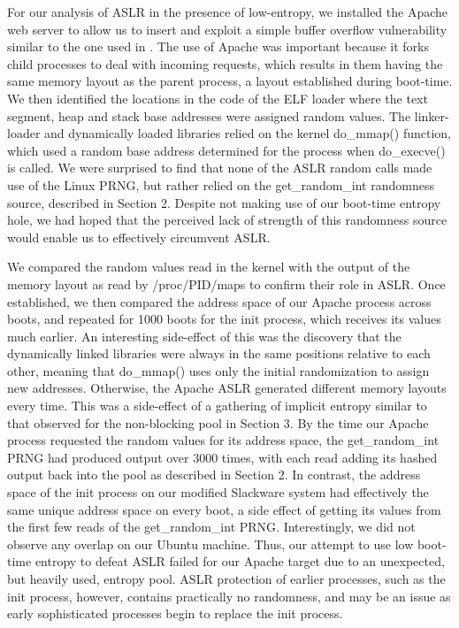 For our analysis of ASLR in the presence of low-entropy, we installed the Apache web server to allow us to insert and exploit a simple buffer overflow vulnerability similar to the one used in \cite{ASLR}.  The use of Apache was important because it forks child processes to deal with incoming requests, which results in them having the same memory layout as the parent process, a layout established during boot-time.  We then identified the locations in the code of the ELF loader where the text segment, heap and stack base addresses were assigned random values.  The linker-loader and dynamically loaded libraries relied on the kernel do\_mmap() function, which used a random base address determined for the process when do\_execve() is called.  We were surprised to find that none of the ASLR random calls made use of the Linux PRNG, but rather relied on the get\_random\_int randomness source, described in Section 2.  Despite not making use of our boot-time entropy hole, we had hoped that the perceived lack of strength of this randomness source would enable us to effectively circumvent ASLR.

We compared the random values read in the kernel with the output of the memory layout as read by /proc/PID/maps to confirm their role in ASLR.  Once established, we then compared the address space of our Apache process across boots, and repeated for 1000 boots for the init process, which receives its values much earlier.  An interesting side-effect of this was the discovery that the dynamically linked libraries were always in the same positions relative to each other, meaning that do\_mmap() uses only the initial randomization to assign new addresses.  Otherwise, the Apache ASLR generated different memory layouts every time.  This was a side-effect of a gathering of implicit entropy similar to that observed for the non-blocking pool in Section 3.  By the time our Apache process requested the random values for its address space, the get\_random\_int PRNG had produced output over 3000 times, with each read adding its hashed output back into the pool as described in Section 2.  In contrast, the address space of the init process on our modified Slackware system had effectively the same unique address space on every boot, a side effect of getting its values from the first few reads of the get\_random\_int PRNG.  Interestingly, we did not observe any overlap on our Ubuntu machine.  Thus, our attempt to use low boot-time entropy to defeat ASLR failed for our Apache target due to an unexpected, but heavily used, entropy pool.  ASLR protection of earlier processes, such as the init process, however, contains practically no randomness, and may be an issue as early sophisticated processes begin to replace the init process. 
